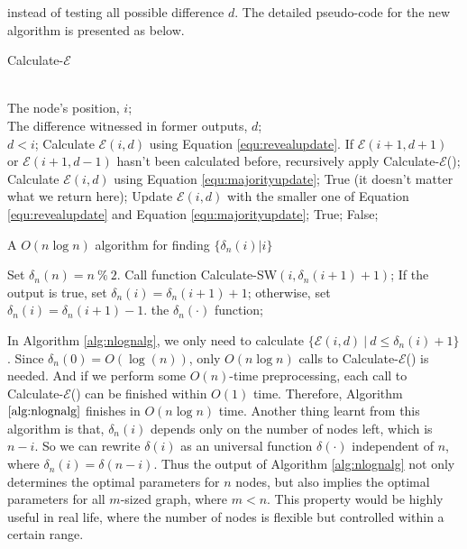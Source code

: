 \documentclass[a4paper,UKenglish]{lipics}
\theoremstyle{definition}
\begin{document}
	instead of testing all possible difference $d$. 
The detailed pseudo-code for the new algorithm is presented as below.
\\
\begin{algorithm}[htb]
\caption{Calculate-$\mathcal{E}$}
\begin{algorithmic}[1]
\REQUIRE ~~\\
	The node's position, $i$;\\
	The difference witnessed in former outputs, $d$;
\ENSURE ~~\\              
	$d < i$;
		\STATE Calculate $\mathcal{E}(i,d)$ using Equation \ref{equ:revealupdate}. 
		\STATE If $\mathcal{E}(i+1, d+1)$ or $\mathcal{E}(i+1, d-1)$ hasn't been calculated before, recursively apply Calculate-$\mathcal{E}$();
	\ELSE
		\STATE Calculate $\mathcal{E}(i,d)$ using Equation \ref{equ:majorityupdate};
	\ENDIF
	\RETURN True (it doesn't matter what we return here);
\ELSE
	\STATE Update $\mathcal{E}(i,d)$ with the smaller one of Equation \ref{equ:revealupdate} and Equation \ref{equ:majorityupdate};
		\RETURN True;
	\ELSE
		\RETURN False;
	\ENDIF
\ENDIF

\end{algorithmic}
\end{algorithm}
\begin{algorithm}[htb]
\caption{A $O(n\log n)$ algorithm for finding $\{\delta_n(i)|i\}$} \label{alg:nlognalg}
\begin{algorithmic}[1]
\STATE Set $\delta_n(n) = n~ \% ~2$.
	\STATE Call function Calculate-SW$(i,\delta_n(i+1)+1)$;
	\STATE If the output is true, set $\delta_n(i) = \delta_n(i+1)+1$; otherwise, set $\delta_n(i) = \delta_n(i+1)-1$.
\ENDFOR
\RETURN the $\delta_n(\cdot)$ function;
\end{algorithmic}
\end{algorithm}

In Algorithm \ref{alg:nlognalg}, we only need to calculate $\{\mathcal{E}(i,d) ~|~ d \le \delta_n(i) + 1\}$.
Since $\delta_n(0) = O(\log(n))$, only $O(n\log n)$ calls to Calculate-$\mathcal{E}$() is needed. 
And if we perform some $O(n)$-time preprocessing, each call to Calculate-$\mathcal{E}$() can be finished within $O(1)$ time. 
Therefore, Algorithm $\ref{alg:nlognalg}$ finishes in $O(n\log n)$ time.
Another thing learnt from this algorithm is that, $\delta_n(i)$ depends only on the number of nodes left, which is $n-i$. 
So we can rewrite $\delta(i)$ as an universal function $\delta(\cdot)$ independent of $n$, where $\delta_n(i) = \delta(n-i)$.
Thus the output of Algorithm \ref{alg:nlognalg} not only determines the optimal parameters for $n$ nodes, 
	but also implies the optimal parameters for all $m$-sized graph, where $m<n$. 
This property would be highly useful in real life, where the number of nodes is flexible but controlled within a certain range.
\end{document}
